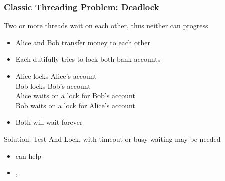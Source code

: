 \begin{slide}
\frametitle{Classic Threading Problem: Deadlock}

Two or more threads wait on each other, thus neither can progress
  \begin{itemize}
  \item Alice and Bob transfer money to each other
  \item Each dutifully tries to lock both bank accounts
  \item [] \vspace{0.5em}
  \footnotesize{Alice locks Alice's account} \\
  \hspace{1cm}\footnotesize{Bob locks Bob's account} \\
  \footnotesize{Alice waits on a lock for Bob's account} \\
  \hspace{1cm}\footnotesize{Bob waits on a lock for Alice's account} \\
  \item Both will wait forever
  \end{itemize}
\vspace{1em}
Solution: Test-And-Lock, with timeout or busy-waiting may be needed
\begin{itemize}
  \item {} can help
  \item {},
\end{itemize}

\end{slide}

